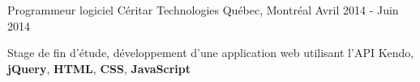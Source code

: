\begin{cventries}
  \cventry
    {Programmeur logiciel} %
    {Céritar Technologies} %
    {Québec, Montréal} %
    {Avril 2014 - Juin 2014} %
    {
      \begin{cvitems} %
        \item {Stage de fin d'étude, développement d'une application web utilisant l'API Kendo, \textbf{jQuery}, \textbf{HTML}, \textbf{CSS}, \textbf{JavaScript}}
      \end{cvitems}
    }

\end{cventries}
